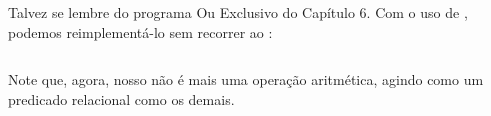 \documentclass{article}
\begin{document}
Talvez se lembre do programa Ou Exclusivo do Capítulo 6. Com o uso de , podemos reimplementá-lo sem recorrer ao :
\vspace{3cm}

\inputminted{prolog}{../Exemplos/Cap8/prog7_xor.pl}

Note que, agora, nosso  não é mais uma operação aritmética, agindo como um predicado relacional como os demais.


\end{document}

